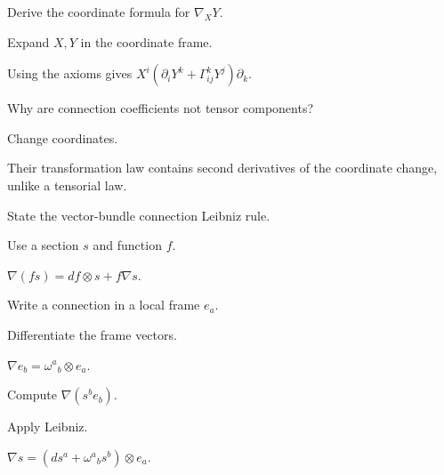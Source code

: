 \begin{exercise}\label{exr:vii21-04}
Derive the coordinate formula for \(\nabla_XY\).
\end{exercise}
\begin{hint}
Expand \(X,Y\) in the coordinate frame.
\end{hint}
\begin{solution}
Using the axioms gives \(X^i(\partial_iY^k+\Gamma^k_{ij}Y^j)\partial_k\).
\end{solution}

\begin{exercise}\label{exr:vii21-05}
Why are connection coefficients not tensor components?
\end{exercise}
\begin{hint}
Change coordinates.
\end{hint}
\begin{solution}
Their transformation law contains second derivatives of the coordinate change, unlike a tensorial law.
\end{solution}

\begin{exercise}\label{exr:vii21-06}
State the vector-bundle connection Leibniz rule.
\end{exercise}
\begin{hint}
Use a section \(s\) and function \(f\).
\end{hint}
\begin{solution}
\(\nabla(fs)=df\otimes s+f\nabla s\).
\end{solution}

\begin{exercise}\label{exr:vii21-07}
Write a connection in a local frame \(e_a\).
\end{exercise}
\begin{hint}
Differentiate the frame vectors.
\end{hint}
\begin{solution}
\(\nabla e_b=\omega^a{}_b\otimes e_a\).
\end{solution}

\begin{exercise}\label{exr:vii21-08}
Compute \(\nabla(s^be_b)\).
\end{exercise}
\begin{hint}
Apply Leibniz.
\end{hint}
\begin{solution}
\(\nabla s=(ds^a+\omega^a{}_b s^b)\otimes e_a\).
\end{solution}

